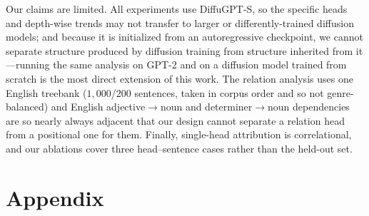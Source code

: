 \documentclass{article} %
\begin{document}
Our claims are limited. All experiments use DiffuGPT-S, so the specific heads and depth-wise trends may not transfer to larger or differently-trained diffusion models; and because it is initialized from an autoregressive checkpoint, we cannot separate structure produced by diffusion training from structure inherited from it---running the same analysis on GPT-2 and on a diffusion model trained from scratch is the most direct extension of this work. The relation analysis uses one English treebank ($1{,}000$/$200$ sentences, taken in corpus order and so not genre-balanced) and English adjective$\to$noun and determiner$\to$noun dependencies are so nearly always adjacent that our design cannot separate a relation head from a positional one for them. Finally, single-head attribution is correlational, and our ablations cover three head--sentence cases rather than the held-out set.





\appendix
\raggedbottom %
\section{Appendix}
\end{document}
